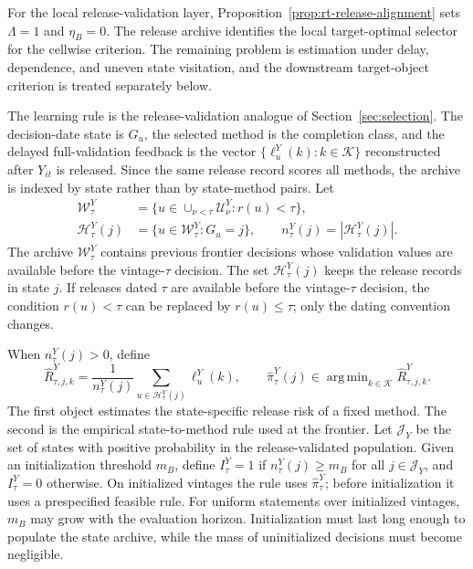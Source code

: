 \documentclass[a4paper, 12pt]{article}
\theoremstyle{plain}
\theoremstyle{remark}
\DeclareMathOperator*{\argmin}{arg\,min}
\newcommand{\Kcal}{\mathcal{K}}
\newcommand{\Ucal}{\mathcal{U}}
\newcommand{\1}{\mathbf{1}}
\begin{document}
For the local release-validation layer, Proposition~\ref{prop:rt-release-alignment} sets \(\Lambda=1\) and \(\eta_B=0\). The release archive identifies the local target-optimal selector for the cellwise criterion. The remaining problem is estimation under delay, dependence, and uneven state visitation, and the downstream target-object criterion is treated separately below.

The learning rule is the release-validation analogue of Section~\ref{sec:selection}. The decision-date state is \(G_u\), the selected method is the completion class, and the delayed full-validation feedback is the vector \(\{\ell^Y_u(k):k\in\Kcal\}\) reconstructed after \(Y_{it}\) is released. Since the same release record scores all methods, the archive is indexed by state rather than by state-method pairs. Let
\begin{equation}
\label{eq:rt-archive}
\begin{aligned}
    \mathcal W^Y_\tau
    &=
    \{u\in\cup_{\nu<\tau}\Ucal^Y_\nu:r(u)<\tau\},
    \\
    \mathcal H^Y_\tau(j)&=\{u\in\mathcal W^Y_\tau:G_u=j\},
    \qquad
    n^Y_\tau(j)=|\mathcal H^Y_\tau(j)| .
\end{aligned}
\end{equation}
The archive \(\mathcal W^Y_\tau\) contains previous frontier decisions whose validation values are available before the vintage-\(\tau\) decision. The set \(\mathcal H^Y_\tau(j)\) keeps the release records in state \(j\). If releases dated \(\tau\) are available before the vintage-\(\tau\) decision, the condition \(r(u)<\tau\) can be replaced by \(r(u)\leq\tau\); only the dating convention changes.

When \(n^Y_\tau(j)>0\), define
\begin{equation}
\label{eq:rt-empirical-risk}
    \widehat R^Y_{\tau,j,k}
    =
    \frac{1}{n^Y_\tau(j)}
    \sum_{u\in\mathcal H^Y_\tau(j)}\ell^Y_u(k),
    \qquad
    \widehat\pi^Y_\tau(j)
    \in
    \argmin_{k\in\Kcal}\widehat R^Y_{\tau,j,k} .
\end{equation}
The first object estimates the state-specific release risk of a fixed method. The second is the empirical state-to-method rule used at the frontier. Let \(\mathcal J_Y\) be the set of states with positive probability in the release-validated population. Given an initialization threshold \(m_B\), define \(I^Y_\tau=1\) if \(n^Y_\tau(j)\geq m_B\) for all \(j\in\mathcal J_Y\), and \(I^Y_\tau=0\) otherwise. On initialized vintages the rule uses \(\widehat\pi^Y_\tau\); before initialization it uses a prespecified feasible rule. For uniform statements over initialized vintages, \(m_B\) may grow with the evaluation horizon. Initialization must last long enough to populate the state archive, while the mass of uninitialized decisions must become negligible.
\end{document}
